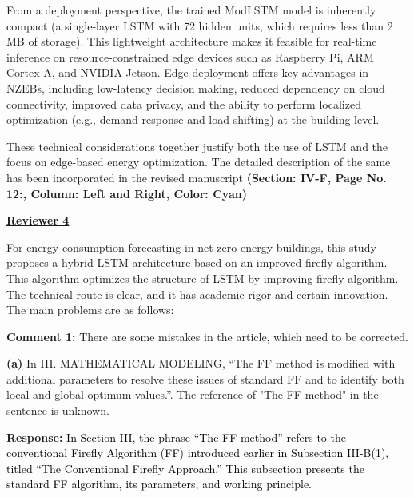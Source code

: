 \documentclass[12pt]{article}
\begin{document}
{From a deployment perspective, the trained ModLSTM model is inherently compact (a single-layer LSTM with 72 hidden units, which requires less than 2 MB of storage). This lightweight architecture makes it feasible for real-time inference on resource-constrained edge devices such as Raspberry Pi, ARM Cortex-A, and NVIDIA Jetson. Edge deployment offers key advantages in NZEBs, including low-latency decision making, reduced dependency on cloud connectivity, improved data privacy, and the ability to perform localized optimization (e.g., demand response and load shifting) at the building level.

These technical considerations together justify both the use of LSTM and the focus on edge-based energy optimization. 
The detailed description of the
same has been incorporated in the revised manuscript \textbf{(Section: IV-F, Page No. 12:, Column: Left and Right, Color: Cyan)}
\newline
\newline


\begin{center}
	\fontsize{14}{1}\textbf{\underline{Reviewer 4}}\\
\end{center}

\hspace{-1.5em} For energy consumption forecasting in net-zero energy buildings, this study proposes a hybrid LSTM architecture based on an improved firefly algorithm. This algorithm optimizes the structure of LSTM by improving firefly algorithm. The technical route is clear, and it has academic rigor and certain innovation. The main problems are as follows:
\newline 

\noindent\textbf{Comment 1:} There are some mistakes in the article, which need to be corrected. \newline

\noindent\textbf{(a)} In III. MATHEMATICAL MODELING, “The FF method is modified with additional parameters to resolve these issues of standard FF and to identify both local and global optimum values.”. The reference of "The FF method" in the sentence is unknown.
\vspace{0.15cm}

\hspace{-1.5em}\textbf{Response:} 
\noindent\textcolor{black}{In Section III, the phrase “The FF method” refers to the conventional Firefly Algorithm (FF) introduced earlier in Subsection III-B(1), titled “The Conventional Firefly Approach.” This subsection presents the standard FF algorithm, its parameters, and working principle.}

}
\end{document}
